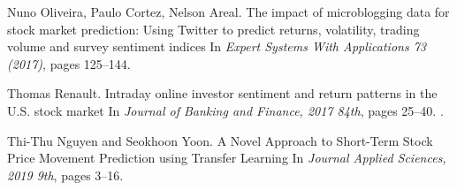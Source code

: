 \documentclass{article}
\begin{document}
\newpage
  


\begin{thebibliography}{1}

Nuno Oliveira, Paulo Cortez, Nelson Areal.
\newblock The impact of microblogging data for stock market prediction: Using
Twitter to predict returns, volatility, trading volume and survey
sentiment indices
\newblock In {\em Expert Systems With Applications 73 (2017)}, pages 125--144.

Thomas Renault.
\newblock Intraday online investor sentiment and return patterns in the U.S.
stock market
\newblock In {\em Journal of Banking and Finance, 2017 84th}, pages 25--40. .

Thi-Thu Nguyen and Seokhoon Yoon.
\newblock A Novel Approach to Short-Term Stock Price
Movement Prediction using Transfer Learning
\newblock In {\em Journal Applied Sciences, 2019 9th}, pages 3--16.

\end{thebibliography}
\end{document}
